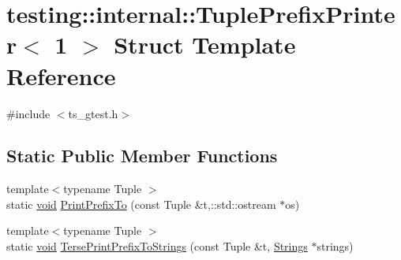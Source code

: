 \hypertarget{structtesting_1_1internal_1_1TuplePrefixPrinter_3_011_01_4}{\section{testing\-:\-:internal\-:\-:Tuple\-Prefix\-Printer$<$ 1 $>$ Struct Template Reference}
\label{structtesting_1_1internal_1_1TuplePrefixPrinter_3_011_01_4}
}


{\ttfamily \#include $<$ts\-\_\-gtest.\-h$>$}

\subsection*{Static Public Member Functions}
\begin{DoxyCompactItemize}
\item 
{\footnotesize template$<$typename Tuple $>$ }\\static \hyperlink{legacy_8hpp_a8bb47f092d473522721002c86c13b94e}{void} \hyperlink{structtesting_1_1internal_1_1TuplePrefixPrinter_3_011_01_4_a90fef286a721920e7269291efbf9e23e}{Print\-Prefix\-To} (const Tuple \&t,\-::std\-::ostream $\ast$os)
\item 
{\footnotesize template$<$typename Tuple $>$ }\\static \hyperlink{legacy_8hpp_a8bb47f092d473522721002c86c13b94e}{void} \hyperlink{structtesting_1_1internal_1_1TuplePrefixPrinter_3_011_01_4_acc513062684bbdd514a294f79a7980cc}{Terse\-Print\-Prefix\-To\-Strings} (const Tuple \&t, \hyperlink{namespacetesting_1_1internal_a7706b17f05f4b49e351b052ae4e05073}{Strings} $\ast$strings)
\end{DoxyCompactItemize}


